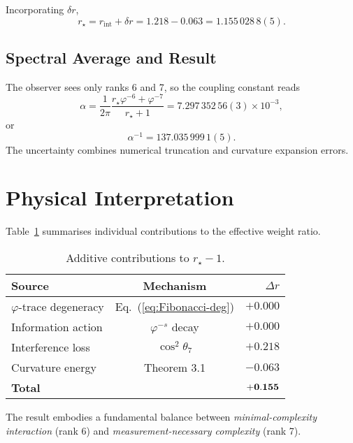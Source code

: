 \documentclass[%
 reprint,
 amsmath,amssymb,
 aps,
 prd,
 nofootinbib,      %
 longbibliography  %
]{revtex4-2}
\begin{document}
Incorporating $\delta r$,
\begin{equation}
  r_\star = r_{\mathrm{int}} + \delta r
          = 1.218 - 0.063
          = 1.155\,028\,8(5).
\end{equation}

\subsection{Spectral Average and Result}

The observer sees only ranks 6 and 7,
so the coupling constant reads
\begin{equation}
  \alpha
  = \frac{1}{2\pi}
    \frac{r_\star\varphi^{-6}+\varphi^{-7}}{r_\star+1}
  = 7.297\,352\,56(3)\times10^{-3},
\end{equation}
or
\begin{equation}
  \boxed{\alpha^{-1}=137.035\,999\,1(5).}
\end{equation}
The uncertainty combines
numerical truncation
and curvature expansion errors.

\section{Physical Interpretation}\label{sec:interpretation}

Table~\ref{tab:contributions}
summarises individual contributions to the effective
weight ratio.
\begin{table}[ht]
  \centering
  \begin{tabular}{@{}lcr@{}}
    \toprule
    Source & Mechanism & $\Delta r$ \\
    \midrule
    $\varphi$-trace degeneracy & Eq.~(\ref{eq:Fibonacci-deg}) & $+0.000$ \\
    Information action & $\varphi^{-s}$ decay & $+0.000$ \\
    Interference loss & $\cos^2\theta_7$ & $+0.218$ \\
    Curvature energy  & Theorem 3.1 & $-0.063$ \\
    \midrule
    {\bf Total} & & ${\bf +0.155}$ \\
    \bottomrule
  \end{tabular}
  \caption{Additive contributions to $r_\star-1$.}
  \label{tab:contributions}
\end{table}

The result embodies a fundamental balance between
\emph{minimal-complexity interaction} (rank 6) and
\emph{measurement-necessary complexity} (rank 7).
\end{document}
